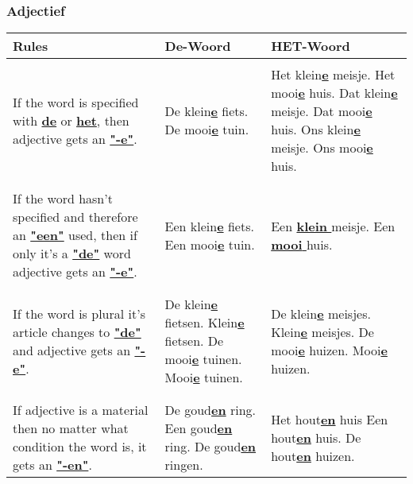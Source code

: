 \documentclass[a4paper,14pt]{extarticle}
\newcommand{\emp}[1]{\underline{\textbf{#1}}}
\begin{document}
\subsubsection{Adjectief}
\begin{tabularx}{\textwidth}{ p{} p{} p{} }
 \hline
 \textbf{Rules} & \textbf{De-Woord} & \textbf{HET-Woord}  \\
 \hline \\
 If the word is specified with \emp{de} or \emp{het}, then adjective gets an \emp{"-e"}. & De klein\emp{e} fiets. \newline De mooi\emp{e} tuin. & Het klein\emp{e} meisje. \newline Het mooi\emp{e} huis. \newline Dat klein\emp{e} meisje. \newline Dat mooi\emp{e} huis. \newline Ons klein\emp{e} meisje. \newline Ons mooi\emp{e} huis. \\
 \\\hline\\
 If the word hasn't specified and therefore an \emp{"een"} used, then if only it's a \emp{"de"} word adjective gets an \emp{"-e"}. & Een klein\emp{e} fiets. \newline Een mooi\emp{e} tuin. & Een \emp{klein } meisje. \newline Een \emp{mooi } huis. \\
 \\\hline\\
 If the word is plural it's article changes to \emp{"de"} and adjective gets an \emp{"-e"}.  & De klein\emp{e} fietsen. \newline Klein\emp{e} fietsen. \newline De mooi\emp{e} tuinen. \newline Mooi\emp{e} tuinen. & De klein\emp{e} meisjes. \newline Klein\emp{e} meisjes. \newline De mooi\emp{e} huizen. \newline Mooi\emp{e} huizen. \\
 \\\hline\\
 If adjective is a material then no matter what condition the word is, it gets an \emp{"-en"}.  & De goud\emp{en} ring. \newline Een goud\emp{en} ring. \newline De goud\emp{en} ringen. & Het hout\emp{en} huis \newline Een hout\emp{en} huis. \newline De hout\emp{en} huizen. \\

\end{tabularx}
\end{document}
